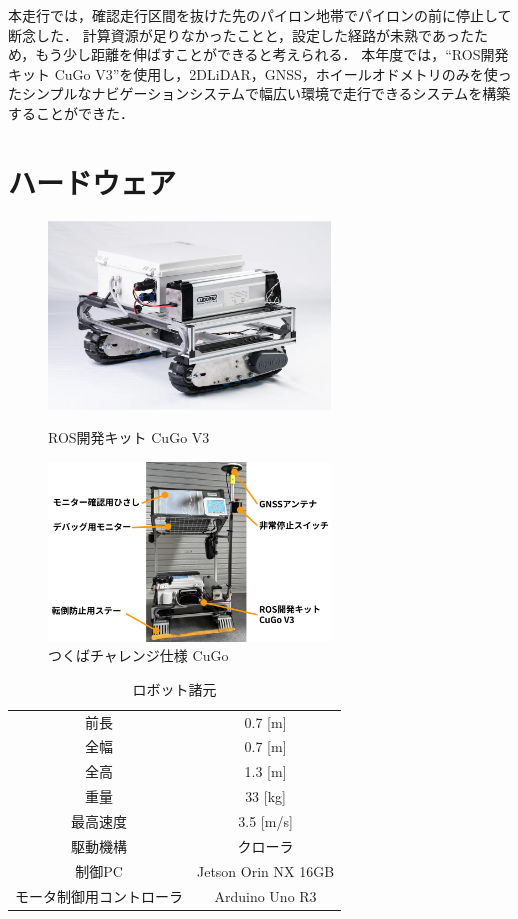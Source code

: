 \documentclass[platex,dvipdfmx]{rbproceedings}
\begin{document}
本走行では，確認走行区間を抜けた先のパイロン地帯でパイロンの前に停止して断念した．
計算資源が足りなかったことと，設定した経路が未熟であったため，もう少し距離を伸ばすことができると考えられる．
本年度では，“ROS開発キット CuGo V3”を使用し，2DLiDAR，GNSS，ホイールオドメトリのみを使ったシンプルなナビゲーションシステムで幅広い環境で走行できるシステムを構築することができた．

\section{ハードウェア}

\begin{figure}[bth]
   \centering
   \begin{minipage}[b]{.45\linewidth}
       \centering   
       \includegraphics[keepaspectratio,width=75mm]{fig/cugo_ros.jpg}
       \caption{ROS開発キット CuGo V3}
       \label{fig:cugo_ros}
   \end{minipage}
   \begin{minipage}[b]{.45\linewidth}
       \centering
       \includegraphics[keepaspectratio,width=75mm]{fig/cugo_tsukuba.png}
       \caption{つくばチャレンジ仕様 CuGo}
       \label{fig:cugo_ros_tsukuba}
   \end{minipage}
\end{figure}

\begin{table}[bth]
    \centering
    \caption{ロボット諸元}
    \label{tab:cugo_ros_tsukuba_spec}
    \begin{tabular}{cc}
        \hline
        前長     & 0.7 [m] \\
        全幅     & 0.7 [m] \\
        全高     & 1.3 [m] \\
        重量     & 33  [kg] \\
        最高速度 & 3.5 [m/s] \\
        駆動機構 & クローラ \\
        制御PC   & Jetson Orin NX 16GB \\
        モータ制御用コントローラ & Arduino Uno R3 \\
        \hline
    \end{tabular}
\end{table}
\end{document}
